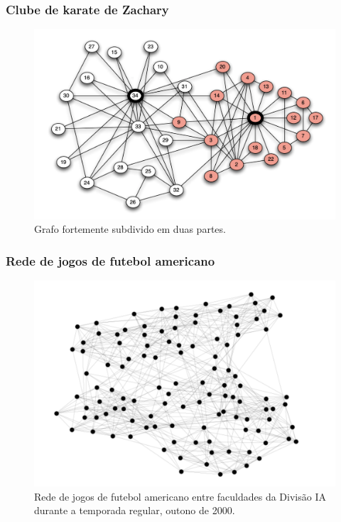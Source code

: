 \documentclass{beamer}
\begin{document}
        \begin{frame}
            \frametitle{Clube de karate de Zachary}
            \begin{figure}
                \centering
                \includegraphics[scale=0.3]{karate-club-network.png}
                \caption{Grafo fortemente subdivido em duas partes.}
            \end{figure}
        \end{frame}

        \begin{frame}
            \frametitle{Rede de jogos de futebol americano}
            \begin{figure}
                \centering
                \includegraphics[scale=0.3]{american-football.png}
                \caption{Rede de jogos de futebol americano entre faculdades da Divisão IA durante a temporada regular, outono de 2000.}
            \end{figure}
        \end{frame}
\end{document}
